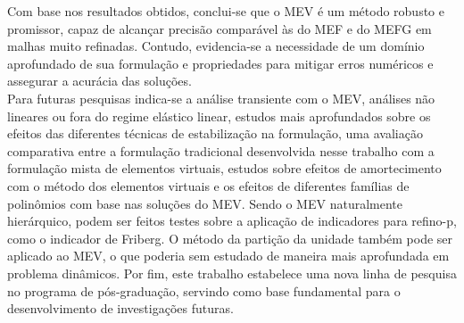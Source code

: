 \indent Com base nos resultados obtidos, conclui-se que o MEV é um método robusto e promissor, capaz de alcançar precisão comparável às do MEF e do MEFG em malhas muito refinadas. Contudo, evidencia-se a necessidade de um domínio aprofundado de sua formulação e propriedades para mitigar erros numéricos e assegurar a acurácia das soluções. \\
\indent Para futuras pesquisas indica-se a análise transiente com o MEV, análises não lineares ou fora do regime elástico linear, estudos mais aprofundados sobre os efeitos das diferentes técnicas de estabilização na formulação, uma avaliação comparativa entre a formulação tradicional desenvolvida nesse trabalho com a formulação mista de elementos virtuais, estudos sobre efeitos de amortecimento com o método dos elementos virtuais e os efeitos de diferentes famílias de polinômios com base nas soluções do MEV. Sendo o MEV naturalmente hierárquico, podem ser feitos testes sobre a aplicação de indicadores para refino-p, como o indicador de Friberg. O método da partição da unidade também pode ser aplicado ao MEV, o que poderia sem estudado de maneira mais aprofundada em problema dinâmicos. Por fim, este trabalho estabelece uma nova linha de pesquisa no programa de pós-graduação, servindo como base fundamental para o desenvolvimento de investigações futuras.